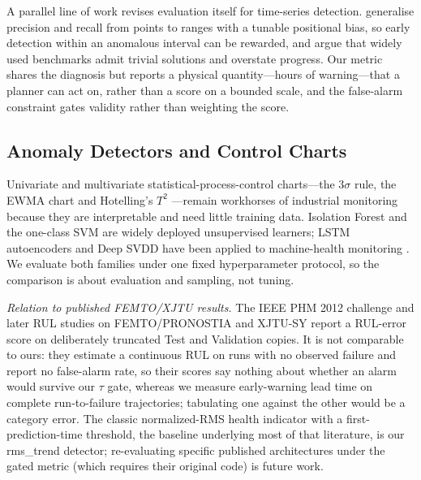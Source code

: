\documentclass[IJPHM, 2026, 0]{PHMSociety}
\makeatletter
\def\PHMslashbreak{\kern\z@\discretionary{}{}{}}
\makeatother
\begin{document}
A parallel line of work revises evaluation itself for time-series detection.  generalise precision and recall from points to ranges with a tunable positional bias, so early detection within an anomalous interval can be rewarded, and  argue that widely used benchmarks admit trivial solutions and overstate progress. Our metric shares the diagnosis but reports a physical quantity---hours of warning---that a planner can act on, rather than a score on a bounded scale, and the false-alarm constraint gates validity rather than weighting the score.

\subsection{Anomaly Detectors and Control Charts}
Univariate and multivariate statistical-process-control charts---the $3\sigma$ rule, the EWMA chart \cite{roberts1959control} and Hotelling's $T^2$ \cite{hotelling1947multivariate}---remain workhorses of industrial monitoring \cite{montgomery2009introduction} because they are interpretable and need little training data. Isolation Forest \cite{liu2008isolation} and the one-class SVM \cite{scholkopf2001estimating} are widely deployed unsupervised learners; LSTM autoencoders \cite{hochreiter1997long,malhotra2016lstm,hundman2018detecting} and Deep SVDD \cite{ruff2018deep} have been applied to machine-health monitoring \cite{zhao2019deep}. We evaluate both families under one fixed hyperparameter protocol, so the comparison is about evaluation and sampling, not tuning.

\emph{Relation to published FEMTO/XJTU results.} The IEEE PHM 2012 challenge and later RUL studies on FEMTO/\PHMslashbreak PRONOSTIA and XJTU-SY \cite{wang2020hybrid,nectoux2012pronostia} report a RUL-error score on deliberately truncated Test and Validation copies. It is not comparable to ours: they estimate a continuous RUL on runs with no observed failure and report no false-alarm rate, so their scores say nothing about whether an alarm would survive our $\tau$ gate, whereas we measure early-warning lead time on complete run-to-failure trajectories; tabulating one against the other would be a category error. The classic normalized-RMS health indicator with a first-prediction-time threshold, the baseline underlying most of that literature, is our rms\_trend detector; re-evaluating specific published architectures under the gated metric (which requires their original code) is future work.
\end{document}
